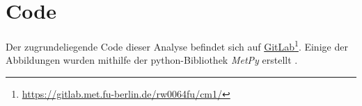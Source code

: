 \section{Code}

Der zugrundeliegende Code dieser Analyse befindet sich auf \href{https://gitlab.met.fu-berlin.de/rw0064fu/cm1/}{GitLab}\footnote{\hypersetup{urlcolor=}\url{https://gitlab.met.fu-berlin.de/rw0064fu/cm1/}}. Einige der Abbildungen wurden mithilfe der python-Bibliothek \textit{MetPy} erstellt \parencite{may2016}.